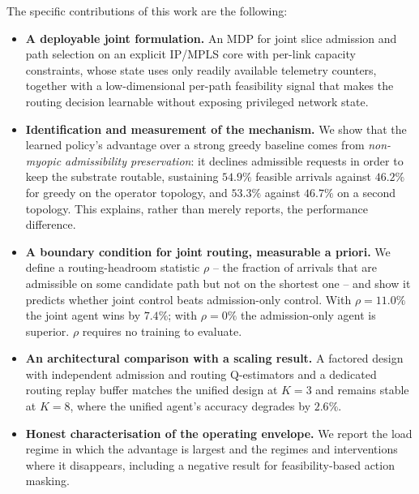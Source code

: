 \documentclass[10pt,journal,comsoc]{IEEEtran}
\begin{document}
The specific contributions of this work are the following:
\begin{itemize}
  \item \textbf{A deployable joint formulation.} An MDP for joint slice
  admission and path selection on an explicit IP/MPLS core with per-link
  capacity constraints, whose state uses only readily available
  telemetry counters, together with a low-dimensional per-path
  feasibility signal that makes the routing decision learnable without
  exposing privileged network state.
  \item \textbf{Identification and measurement of the mechanism.} We show
  that the learned policy's advantage over a strong greedy baseline comes
  from \emph{non-myopic admissibility preservation}: it declines
  admissible requests in order to keep the substrate routable, sustaining
  $54.9\%$ feasible arrivals against $46.2\%$ for greedy on the operator
  topology, and $53.3\%$ against $46.7\%$ on a second topology. This
  explains, rather than merely reports, the performance difference.
  \item \textbf{A boundary condition for joint routing, measurable a
  priori.} We define a routing-headroom statistic $\rho$ -- the fraction
  of arrivals that are admissible on some candidate path but not on the
  shortest one -- and show it predicts whether joint control beats
  admission-only control. With $\rho=11.0\%$ the joint agent wins by
  $7.4\%$; with $\rho=0\%$ the admission-only agent is superior. $\rho$
  requires no training to evaluate.
  \item \textbf{An architectural comparison with a scaling result.} A
  factored design with independent admission and routing Q-estimators and
  a dedicated routing replay buffer matches the unified design at $K=3$
  and remains stable at $K=8$, where the unified agent's accuracy
  degrades by $2.6\%$.
  \item \textbf{Honest characterisation of the operating envelope.} We
  report the load regime in which the advantage is largest and the
  regimes and interventions where it disappears, including a negative
  result for feasibility-based action masking.
\end{itemize}
\end{document}
